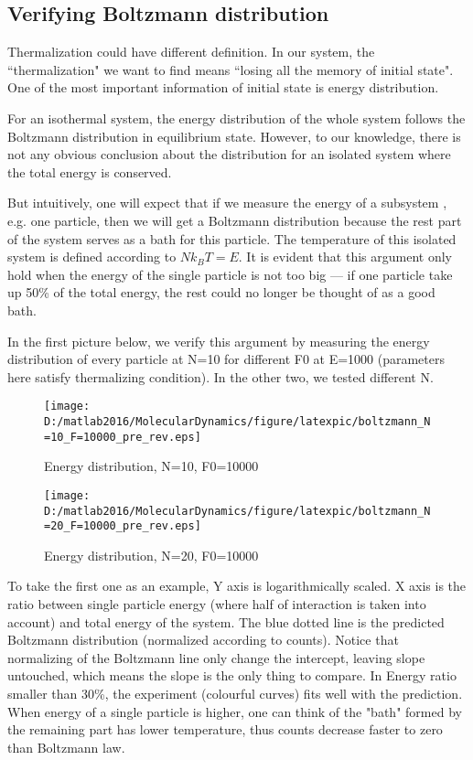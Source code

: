 \documentclass[aps,pre,twocolumn,groupedaddress]{revtex4-1}
\begin{document}
\subsection{Verifying Boltzmann distribution}
Thermalization could have different definition. In our system, the ``thermalization" we want to find means ``losing all the memory of initial state". One of the most important information of initial state is energy distribution. 
 
For an isothermal system, the energy distribution of the whole system follows the Boltzmann distribution in equilibrium state. However, to our knowledge, there is not any obvious conclusion about the distribution for an isolated system where the total energy is conserved.

But intuitively, one will expect that if we measure the energy of a subsystem , e.g. one particle, then we will get a Boltzmann distribution because the rest part of the system serves as a bath for this particle. The temperature of this isolated system is defined according to $Nk_BT=E$. It is evident that this argument only hold when the energy of the single particle is not too big --- if one particle take up 50\% of the total energy, the rest could no longer be thought of as a good bath.

In the first picture below, we verify this argument by measuring the energy distribution of every particle at N=10 for different F0 at E=1000 (parameters here satisfy thermalizing condition). In the other two, we tested different N.


\begin{figure}[hbtp]
\centering

\texttt{[image: D:/matlab2016/MolecularDynamics/figure/latexpic/boltzmann\_N=10\_F=10000\_pre\_rev.eps]}
\caption{Energy distribution, N=10, F0=10000}
\label{fig:thermalization9}

\texttt{[image: D:/matlab2016/MolecularDynamics/figure/latexpic/boltzmann\_N=20\_F=10000\_pre\_rev.eps]} 
\caption{Energy distribution, N=20, F0=10000}
\label{fig:thermalization10}
\end{figure}



To take the first one as an example, Y axis is logarithmically scaled. X axis is the ratio between single particle energy (where half of interaction is taken into account) and total energy of the system. The blue dotted line is the predicted Boltzmann distribution (normalized according to counts). Notice that normalizing of the Boltzmann line only change the intercept, leaving slope untouched, which means the slope is the only thing to compare. In  Energy ratio smaller than 30\%, the experiment (colourful curves) fits well with the prediction. When energy of a single particle is higher, one can think of the "bath" formed by the remaining part has lower temperature, thus counts decrease faster to zero than Boltzmann law.
\end{document}
